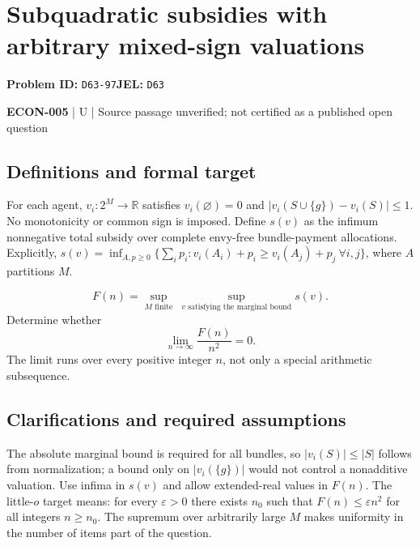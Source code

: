 \documentclass[11pt,a4paper]{article}
\begin{document}
\section*{Subquadratic subsidies with arbitrary mixed-sign valuations}
\textbf{Problem ID:} \texttt{D63-97}\quad \textbf{JEL:} \texttt{D63}\par
\label{problem:OP-0592}


\label{audited:ECON-005}

{\sffamily\small\color{muted}\textbf{ECON-005} | U | Source passage unverified; not certified as a published open question\par}

\subsection*{Definitions and formal target}

For each agent, $v_i:2^M\to\mathbb R$ satisfies $v_i(\varnothing)=0$ and $|v_i(S\cup\{g\})-v_i(S)|\leq1$. No monotonicity or common sign is imposed. Define $s(v)$ as the infimum nonnegative total subsidy over complete envy-free bundle-payment allocations. Explicitly, $s(v)=\inf_{A,p\geq0}\{\sum_i p_i:v_i(A_i)+p_i\geq v_i(A_j)+p_j\ \forall i,j\}$, where $A$ partitions $M$.

\[
 F(n)=\sup_{M\text{ finite}}\ \sup_{v\text{ satisfying the marginal bound}}s(v).
\]
Determine whether
\[
 \lim_{n\to\infty}\frac{F(n)}{n^2}=0.
\]
The limit runs over every positive integer $n$, not only a special arithmetic subsequence.

\subsection*{Clarifications and required assumptions}

The absolute marginal bound is required for all bundles, so $|v_i(S)|\leq|S|$ follows from normalization; a bound only on $|v_i(\{g\})|$ would not control a nonadditive valuation. Use infima in $s(v)$ and allow extended-real values in $F(n)$. The little-$o$ target means: for every $\varepsilon>0$ there exists $n_0$ such that $F(n)\leq\varepsilon n^2$ for all integers $n\geq n_0$. The supremum over arbitrarily large $M$ makes uniformity in the number of items part of the question.
\end{document}
